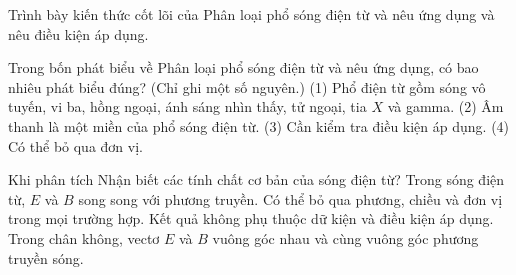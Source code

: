 \begin{bt}
Trình bày kiến thức cốt lõi của Phân loại phổ sóng điện từ và nêu ứng dụng và nêu điều kiện áp dụng.
\end{bt}

\begin{ex}
Trong bốn phát biểu về Phân loại phổ sóng điện từ và nêu ứng dụng, có bao nhiêu phát biểu đúng? (Chỉ ghi một số nguyên.) (1) Phổ điện từ gồm sóng vô tuyến, vi ba, hồng ngoại, ánh sáng nhìn thấy, tử ngoại, tia $X$ và gamma. (2) Âm thanh là một miền của phổ sóng điện từ. (3) Cần kiểm tra điều kiện áp dụng. (4) Có thể bỏ qua đơn vị.
\end{ex}

\begin{ex}
Khi phân tích Nhận biết các tính chất cơ bản của sóng điện từ?
\choice
{Trong sóng điện từ, $E$ và $B$ song song với phương truyền.}
{Có thể bỏ qua phương, chiều và đơn vị trong mọi trường hợp.}
{Kết quả không phụ thuộc dữ kiện và điều kiện áp dụng.}
{\True Trong chân không, vectơ $E$ và $B$ vuông góc nhau và cùng vuông góc phương truyền sóng.}
\end{ex}

